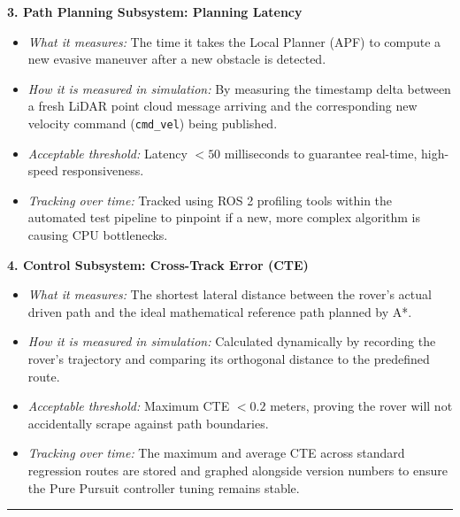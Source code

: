 \documentclass[12pt,a4paper]{article}
\begin{document}
\noindent\textbf{3. Path Planning Subsystem: Planning Latency}
\begin{itemize}[leftmargin=*]
    \item \textit{What it measures:} The time it takes the Local Planner (APF) to compute a new evasive maneuver after a new obstacle is detected.
    \item \textit{How it is measured in simulation:} By measuring the timestamp delta between a fresh LiDAR point cloud message arriving and the corresponding new velocity command (\texttt{cmd\_vel}) being published.
    \item \textit{Acceptable threshold:} Latency $< 50$ milliseconds to guarantee real-time, high-speed responsiveness.
    \item \textit{Tracking over time:} Tracked using ROS 2 profiling tools within the automated test pipeline to pinpoint if a new, more complex algorithm is causing CPU bottlenecks.
\end{itemize}

\noindent\textbf{4. Control Subsystem: Cross-Track Error (CTE)}
\begin{itemize}[leftmargin=*]
    \item \textit{What it measures:} The shortest lateral distance between the rover's actual driven path and the ideal mathematical reference path planned by A*.
    \item \textit{How it is measured in simulation:} Calculated dynamically by recording the rover's trajectory and comparing its orthogonal distance to the predefined route.
    \item \textit{Acceptable threshold:} Maximum CTE $< 0.2$ meters, proving the rover will not accidentally scrape against path boundaries.
    \item \textit{Tracking over time:} The maximum and average CTE across standard regression routes are stored and graphed alongside version numbers to ensure the Pure Pursuit controller tuning remains stable.
\end{itemize}

\vspace{0.3em}
\noindent\rule{\textwidth}{0.4pt}
\vspace{0.3em}
\end{document}
